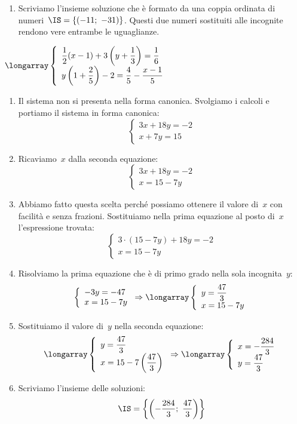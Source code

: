 \begin{enumerate}
 \item Scriviamo l'insieme soluzione che è formato da una coppia ordinata 
 di numeri~\(\IS=\{(-11;~-31)\}\). Questi due numeri sostituiti alle incognite 
 rendono vere entrambe le uguaglianze.
\end{enumerate}

\begin{esempio}
\(\longarray\left\{\begin{array}{l}
  \dfrac{1}{2}(x-1)+3\left(y+\dfrac{1}{3}\right)=\dfrac{1}{6}\\
  y\left(1+\dfrac{2}{5}\right)-2=\dfrac{4}{5}-\dfrac{x-1}{5}
  \end{array}\right.\)

\begin{enumerate}
 \item Il sistema non si presenta nella forma canonica. Svolgiamo i calcoli e 
portiamo il sistema in forma canonica:
\[\left\{\begin{array}{l}3x+18y=-2\\x+7y=15\end{array}\right.\]

\item Ricaviamo~\(x\) dalla seconda equazione:
\[\left\{\begin{array}{l}3x+18y=-2\\x=15-7y\end{array}\right.\]

\item Abbiamo fatto questa scelta perché possiamo ottenere il valore di~\(x\)
con facilità e senza frazioni. Sostituiamo nella prima equazione al posto di~\(x\)
l'espressione trovata:
\[\left\{\begin{array}{l}
          3\cdot(15-7y)+18y=-2\\
          x=15-7y
          \end{array}\right.
\]
\item Risolviamo la prima equazione che è di primo grado nella sola
incognita~\(y\):
\[\left\{\begin{array}{l}
          -3y=-47\\
          x=15-7y
          \end{array}\right.
\Rightarrow\longarray\left\{\begin{array}{l}
          y=\dfrac{47}{3}\\
          x=15-7y
         \end{array}\right.\]
\item Sostituiamo il valore di~\(y\) nella seconda equazione:
\[\longarray\left\{\begin{array}{l}
          y=\dfrac{47}{3}\\
          x=15-7\left(\dfrac{47}{3}\right)
          \end{array}\right.
\Rightarrow \longarray\left\{\begin{array}{l}x=-\dfrac{284}{3}\\
 y=\dfrac{47}{3}\end{array}\right.\]
\item Scriviamo l'insieme delle soluzioni:
\[\IS=\left\{\left(-\frac{284}{3};~\frac{47}{3}\right)\right\}\]
\end{enumerate}


\end{esempio}
